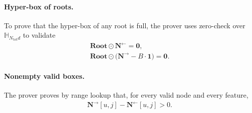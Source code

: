 \paragraph{Hyper-box of roots.}
To prove that the hyper-box of any root is full, the prover uses zero-check over $\mathbb{H}_{N_{\mathrm{tot}}d}$ to validate
    \begin{align}
        \mathbf{Root} \odot \mathbf{N}^{\leftarrow} = \mathbf{0}, \\
        \mathbf{Root} \odot \bigl(\mathbf{N}^{\rightarrow} - B\cdot\mathbf{1}\bigr) = \mathbf{0}.
    \end{align}

\paragraph{Nonempty valid boxes.}
The prover proves by range
lookup that, for every valid node and every feature,
\begin{align}
    \mathbf{N}^{\rightarrow}[u,j]-\mathbf{N}^{\leftarrow}[u,j] > 0.
\end{align}

